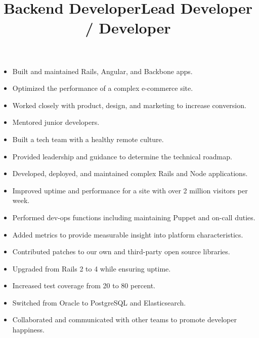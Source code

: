 \documentclass[line]{res}
\begin{document}
\begin{resume}
\begin{position}
\begin{itemize}
\item Built and maintained Rails, Angular, and Backbone apps.
\item Optimized the performance of a complex e-commerce site.
\item Worked closely with product, design, and marketing to increase conversion.
\item Mentored junior developers.
\item Built a tech team with a healthy remote culture.
\item Provided leadership and guidance to determine the technical roadmap.

\end{itemize}
\end{position}

\title{Backend Developer}
\begin{position}
\noindent
\vspace {-10 pt}
\begin{itemize}

\item Developed, deployed, and maintained complex Rails and Node applications.
\item Improved uptime and performance for a site with over 2 million visitors per week.
\item Performed dev-ops functions including maintaining Puppet and on-call duties.
\item Added metrics to provide measurable insight into platform characteristics.
\item Contributed patches to our own and third-party open source libraries.
\item Upgraded from Rails 2 to 4 while ensuring uptime.
\item Increased test coverage from 20 to 80 percent.
\item Switched from Oracle to PostgreSQL and Elasticsearch.
\item Collaborated and communicated with other teams to promote developer happiness.

\end{itemize}
\end{position}

\title{Lead Developer / Developer}
\begin{position}
\noindent
\vspace {-10 pt}
\begin{itemize}


\end{itemize}
\end{position}
\end{resume}
\end{document}
